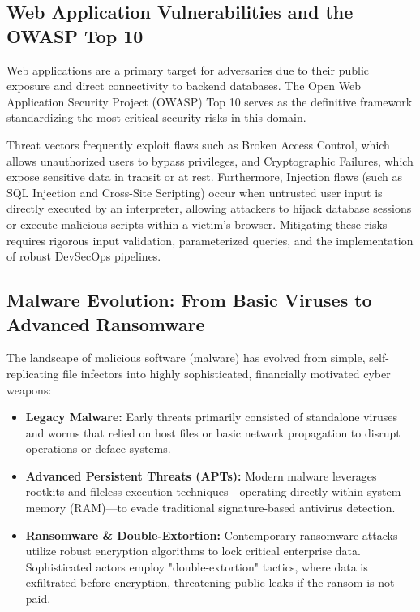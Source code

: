 \documentclass[11pt,a4paper]{article}
\begin{document}
\subsection{Web Application Vulnerabilities and the OWASP Top 10}
Web applications are a primary target for adversaries due to their public exposure and direct connectivity to backend databases. The Open Web Application Security Project (OWASP) Top 10 serves as the definitive framework standardizing the most critical security risks in this domain.
\vspace{1em}

Threat vectors frequently exploit flaws such as Broken Access Control, which allows unauthorized users to bypass privileges, and Cryptographic Failures, which expose sensitive data in transit or at rest. Furthermore, Injection flaws (such as SQL Injection and Cross-Site Scripting) occur when untrusted user input is directly executed by an interpreter, allowing attackers to hijack database sessions or execute malicious scripts within a victim's browser. Mitigating these risks requires rigorous input validation, parameterized queries, and the implementation of robust DevSecOps pipelines.

\subsection{Malware Evolution: From Basic Viruses to Advanced Ransomware}
The landscape of malicious software (malware) has evolved from simple, self-replicating file infectors into highly sophisticated, financially motivated cyber weapons:

\begin{itemize}
    \item \textbf{Legacy Malware:} Early threats primarily consisted of standalone viruses and worms that relied on host files or basic network propagation to disrupt operations or deface systems.

    \item \textbf{Advanced Persistent Threats (APTs):} Modern malware leverages rootkits and fileless execution techniques—operating directly within system memory (RAM)—to evade traditional signature-based antivirus detection.

    \item \textbf{Ransomware \& Double-Extortion:} Contemporary ransomware attacks utilize robust encryption algorithms to lock critical enterprise data. Sophisticated actors employ "double-extortion" tactics, where data is exfiltrated before encryption, threatening public leaks if the ransom is not paid.
\end{itemize}
\end{document}
